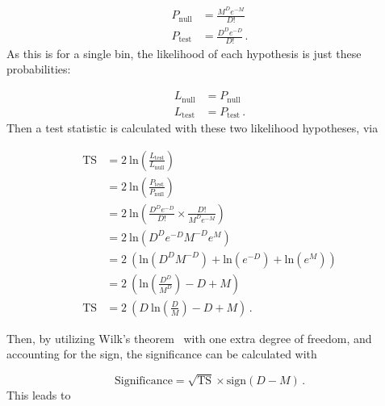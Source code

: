   \begin{equation}\label{eqn:sig_hypo}
    \begin{split}
      P_{\textrm{null}} & = \frac{M^{D} e^{-M}}{D!} \\
      P_{\textrm{test}} & = \frac{D^{D} e^{-D}}{D!} \,.
    \end{split}
  \end{equation}
  As this is for a single bin, the likelihood of each hypothesis is just these probabilities:
  
  \begin{equation}
    \begin{split}
      L_{\textrm{null}} & = P_{\textrm{null}} \\
      L_{\textrm{test}} & = P_{\textrm{test}} \,.
    \end{split}
  \end{equation}
  Then a test statistic is calculated with these two likelihood hypotheses, via

  \begin{equation}
    \begin{split}
      \textrm{TS} & = 2 \: \textrm{ln} \left ( \frac{ L_{\textrm{test}} }{ L_{\textrm{null}}    } \right ) \\
                  & = 2 \: \textrm{ln} \left ( \frac{ P_{\textrm{test}} }{ P_{\textrm{null}}    } \right ) \\
                  & = 2 \: \textrm{ln} \left ( \frac{D^D e^{-D}}{D!} \times \frac{D!}{M^D e^{-M}} \right ) \\
                  & = 2 \: \textrm{ln} \left ( D^D e^{-D} M^{-D} e^M                              \right ) \\
                  & = 2 \: \left (      \textrm{ln} \left ( D^D M^{-D} \right ) + \textrm{ln} \left ( e^{-D} \right ) + \textrm{ln} \left ( e^M  \right )\right ) \\
                  & = 2 \: \left (      \textrm{ln} \left (  \frac{D^D}{M^D} \right ) -D + M \right ) \\
      \textrm{TS} & = 2 \: \left ( D \: \textrm{ln} \left (  \frac{D  }{M  } \right ) -D + M \right ) \,.
    \end{split}
  \end{equation}
  
  Then, by utilizing Wilk's theorem~\cite{wilks1938} with one extra degree of freedom, and accounting for the sign, the significance can be calculated with
    
  \begin{equation}
    \textrm{Significance} = \sqrt{\textrm{TS}} \times \textrm{sign} \left ( D - M \right ) \,.
  \end{equation}
  This leads to
  
